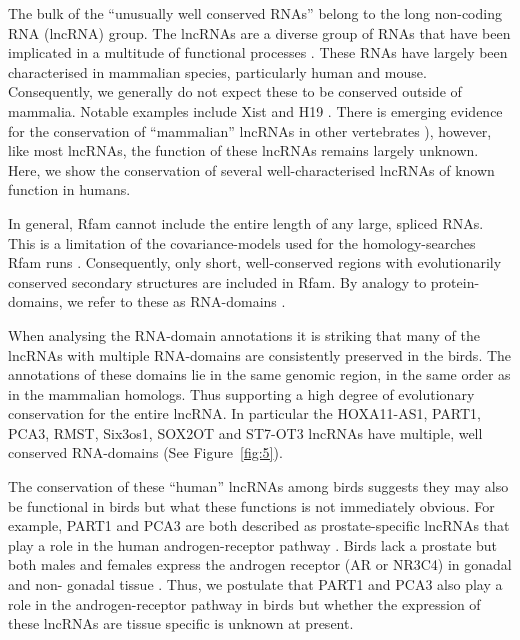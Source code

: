 \documentclass[10pt]{bmc_article}
\newenvironment{bmcformat}{\begin{raggedright}\baselineskip20pt\sloppy\setboolean{publ}{false}}{\end{raggedright}\baselineskip20pt\sloppy}
\begin{document}
\begin{bmcformat}
The bulk of the ``unusually well conserved RNAs'' belong to the long
non-coding RNA (lncRNA) group.  The lncRNAs are a diverse group of
RNAs that have been implicated in a multitude of functional processes
\cite{Rinn:2007,Chow:2005,Guttman:2009}. These RNAs have largely been
characterised in mammalian species, particularly human and
mouse. Consequently, we generally do not expect these to be conserved
outside of mammalia. Notable examples include Xist \cite{Duret:2006}
and H19 \cite{Smits:2008}.  There is emerging evidence for the
conservation of “mammalian” lncRNAs in other vertebrates
\cite{Chodroff:2010,Ulitsky:2011}), however, like most lncRNAs, the
function of these lncRNAs remains largely unknown. Here, we show the
conservation of several well-characterised lncRNAs of known function
in humans. 

In general, Rfam cannot include the entire length of any large, spliced
RNAs. This is a limitation of the covariance-models used for the
homology-searches Rfam runs \cite{Nawrocki:2009}. Consequently, only
short, well-conserved regions with evolutionarily conserved secondary
structures are included in Rfam. By analogy to protein-domains, we
refer to these as RNA-domains \cite{Burge:2013}.

When analysing the RNA-domain annotations it is striking that many of
the lncRNAs with multiple RNA-domains are consistently preserved in
the birds. The annotations of these domains lie in the same genomic
region, in the same order as in the mammalian homologs. Thus
supporting a high degree of evolutionary conservation for the entire
lncRNA. In particular the HOXA11-AS1, PART1, PCA3, RMST, Six3os1, SOX2OT and
ST7-OT3 lncRNAs have multiple, well conserved RNA-domains (See
Figure~\ref{fig:5}).

 The conservation of these ``human'' lncRNAs among birds
suggests they may also be functional in birds but what these
functions is not immediately obvious. For example, PART1 and
PCA3 are both described as prostate-specific lncRNAs that play a role
in the human androgen-receptor pathway
\cite{Bussemakers:1999,Lin:2000,Ferreira:2012}. Birds lack a prostate
but both males and females express the androgen receptor (AR or NR3C4) in gonadal
and non- gonadal tissue
\cite{Yoshimura:1993,Veney:2004,Fuxjager:2012,Leska:2012}. Thus, we
postulate that PART1 and PCA3 also play a role in the
androgen-receptor pathway in birds but whether the expression of these
lncRNAs are tissue specific is unknown at present.


\end{bmcformat}
\end{document}
